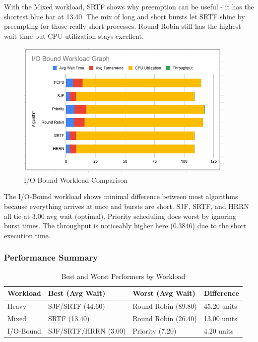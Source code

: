 \documentclass[12pt,letterpaper]{article}
\begin{document}
With the Mixed workload, SRTF shows why preemption can be useful - it has the 
shortest blue bar at 13.40. The mix of long and short bursts let SRTF shine by 
preempting for those really short processes. Round Robin still has the highest 
wait time but CPU utilization stays excellent.

\begin{figure}[H]
    \centering
    \includegraphics[width=0.95\textwidth]{io_bound_workload_graph.png}
    \caption{I/O-Bound Workload Comparison}
    \label{fig:io_graph}
\end{figure}

The I/O-Bound workload shows minimal difference between most algorithms because 
everything arrives at once and bursts are short. SJF, SRTF, and HRRN all tie 
at 3.00 avg wait (optimal). Priority scheduling does worst by ignoring burst 
times. The throughput is noticeably higher here (0.3846) due to the short 
execution time.

\subsubsection{Performance Summary}

\begin{table}[H]
\centering
\caption{Best and Worst Performers by Workload}
\begin{tabular}{@{}llll@{}}
\toprule
\textbf{Workload} & \textbf{Best (Avg Wait)} & \textbf{Worst (Avg Wait)} & \textbf{Difference} \\ \midrule
Heavy & SJF/SRTF (44.60) & Round Robin (89.80) & 45.20 units \\
Mixed & SRTF (13.40) & Round Robin (26.40) & 13.00 units \\
I/O-Bound & SJF/SRTF/HRRN (3.00) & Priority (7.20) & 4.20 units \\ \bottomrule
\end{tabular}
\end{table}
\end{document}
